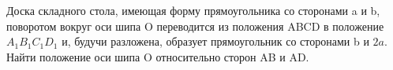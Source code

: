 Доска складного стола, имеющая форму прямоугольника со сторонами a и b,
поворотом вокруг оси шипа O переводится из положения ABCD в положение
$A_{1}B_{1}C_{1}D_{1}$ и, будучи разложена, образует прямоугольник со
сторонами b и $2a$. Найти положение оси шипа O относительно сторон AB и AD.
